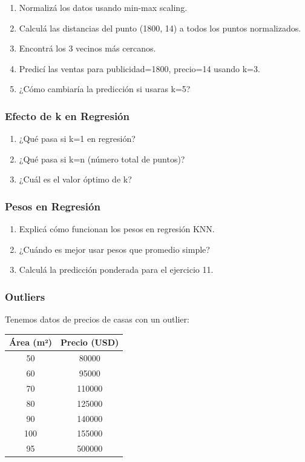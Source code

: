 \documentclass[12pt]{article}
\begin{document}
\begin{enumerate}
    \item Normalizá los datos usando min-max scaling.
    \item Calculá las distancias del punto (1800, 14) a todos los puntos normalizados.
    \item Encontrá los 3 vecinos más cercanos.
    \item Predicí las ventas para publicidad=1800, precio=14 usando k=3.
    \item ¿Cómo cambiaría la predicción si usaras k=5?
\end{enumerate}

\subsubsection{Efecto de k en Regresión}

\begin{enumerate}
    \item ¿Qué pasa si k=1 en regresión?
    \item ¿Qué pasa si k=n (número total de puntos)?
    \item ¿Cuál es el valor óptimo de k?
\end{enumerate}

\subsubsection{Pesos en Regresión}

\begin{enumerate}
    \item Explicá cómo funcionan los pesos en regresión KNN.
    \item ¿Cuándo es mejor usar pesos que promedio simple?
    \item Calculá la predicción ponderada para el ejercicio 11.
\end{enumerate}

\subsubsection{Outliers}

Tenemos datos de precios de casas con un outlier:

\begin{table}[H]
    \centering
    \begin{tabular}{cc}
        \toprule
        \textbf{Área (m²)} & \textbf{Precio (USD)} \\
        \midrule
        50 & 80000 \\
        60 & 95000 \\
        70 & 110000 \\
        80 & 125000 \\
        90 & 140000 \\
        100 & 155000 \\
        95 & 500000 \\  %
        \bottomrule
    \end{tabular}
\end{table}
\end{document}
